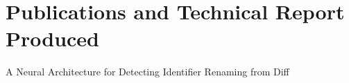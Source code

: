 \chapter{Publications and Technical Report Produced}
\label{sec:produced-publications}

A Neural Architecture for Detecting Identifier Renaming from Diff